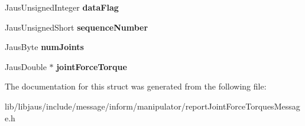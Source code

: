 \begin{DoxyCompactItemize}
\item 
\hypertarget{struct_report_joint_force_torques_message_struct_acab5fc5e8b571ffefa0c623107734306}{\-Jaus\-Unsigned\-Integer {\bfseries data\-Flag}}\label{struct_report_joint_force_torques_message_struct_acab5fc5e8b571ffefa0c623107734306}

\item 
\hypertarget{struct_report_joint_force_torques_message_struct_aa5a64333361dbb422b3ed7cffbc9fb39}{\-Jaus\-Unsigned\-Short {\bfseries sequence\-Number}}\label{struct_report_joint_force_torques_message_struct_aa5a64333361dbb422b3ed7cffbc9fb39}

\item 
\hypertarget{struct_report_joint_force_torques_message_struct_ad3e554c6da375a44b59f18ae0d4ac770}{\-Jaus\-Byte {\bfseries num\-Joints}}\label{struct_report_joint_force_torques_message_struct_ad3e554c6da375a44b59f18ae0d4ac770}

\item 
\hypertarget{struct_report_joint_force_torques_message_struct_af2c695cca7debb6d914334f036506c52}{\-Jaus\-Double $\ast$ {\bfseries joint\-Force\-Torque}}\label{struct_report_joint_force_torques_message_struct_af2c695cca7debb6d914334f036506c52}

\end{DoxyCompactItemize}


\-The documentation for this struct was generated from the following file\-:\begin{DoxyCompactItemize}
\item 
lib/libjaus/include/message/inform/manipulator/report\-Joint\-Force\-Torques\-Message.\-h\end{DoxyCompactItemize}

